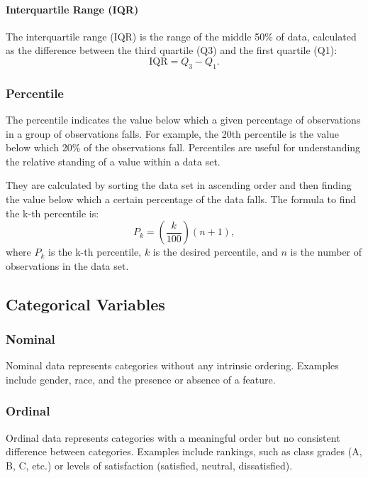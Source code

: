\paragraph{Interquartile Range (IQR)}
The interquartile range (IQR) is the range of the middle 50\% of data, calculated as the difference between the third quartile (Q3) and the first quartile (Q1):
\begin{equation}
\text{IQR} = Q_3 - Q_1.
\end{equation}

\subsubsection{Percentile}\label{Percentile}
The percentile indicates the value below which a given percentage of observations in a group of observations falls. For example, the 20th percentile is the value below which 20\% of the observations fall. Percentiles are useful for understanding the relative standing of a value within a data set.

\emptyline
They are calculated by sorting the data set in ascending order and then finding the value below which a certain percentage of the data falls. The formula to find the k-th percentile is:
\begin{equation}
P_k = \left( \frac{k}{100} \right) (n + 1),
\end{equation}
where $P_k$ is the k-th percentile, $k$ is the desired percentile, and $n$ is the number of observations in the data set.

\subsection{Categorical Variables}\label{Categorical Variables}
\subsubsection{Nominal}\label{Nominal}
Nominal data represents categories without any intrinsic ordering. Examples include gender, race, and the presence or absence of a feature.

\subsubsection{Ordinal}\label{Ordinal}
Ordinal data represents categories with a meaningful order but no consistent difference between categories. Examples include rankings, such as class grades (A, B, C, etc.) or levels of satisfaction (satisfied, neutral, dissatisfied).

